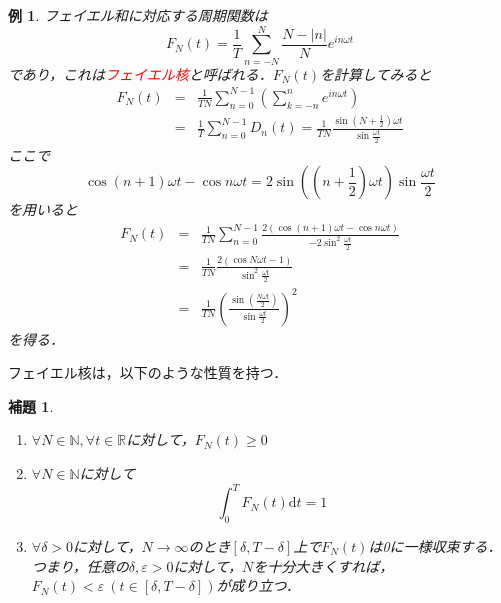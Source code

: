 \documentclass[a4j]{jsbook}
\newtheorem{lemma}[theorem]{補題}
\newtheorem{example}[theorem]{例}
\numberwithin{theorem}{chapter}  %
\begin{document}
\begin{example} 
\label{ex2-8}
フェイエル和に対応する周期関数は
\begin{equation*}
    F_N(t)=\frac{1}{T}\sum_{n=-N}^N\frac{N-|n|}{N}e^{in\omega t}
\end{equation*}
であり，これは\textcolor{red}{フェイエル核}と呼ばれる．\(F_N(t)\)を計算してみると
\begin{eqnarray*}
F_N(t)&=&\frac{1}{TN}\sum_{n=0}^{N-1}\left(\sum_{k=-n}^n e^{in\omega t}\right) \\
&=&\frac{1}{T}\sum_{n=0}^{N-1}D_n(t)=\frac{1}{TN}\frac{\sin\left(N+\frac{1}{2}\right)\omega t}{\sin\frac{\omega t}{2}}
\end{eqnarray*}
ここで
\begin{equation*}
    \cos(n+1)\omega t-\cos n\omega t=2\sin\left(\left(n+\frac{1}{2}\right)\omega t\right)\sin\frac{\omega t}{2}
\end{equation*}
を用いると
\begin{eqnarray*}
F_N(t)&=&\frac{1}{TN}\sum_{n=0}^{N-1}\frac{2(\cos(n+1)\omega t-\cos n\omega t)}{-2\sin^2\frac{\omega t}{2}} \\
&=&\frac{1}{TN}\frac{2(\cos N\omega t-1)}{\sin^2\frac{\omega t}{2}} \\
&=&\frac{1}{TN}\left(\frac{\sin\left(\frac{N\omega t}{2}\right)}{\sin\frac{\omega t}{2}}\right)^2
\end{eqnarray*}
を得る．
\end{example}
フェイエル核は，以下のような性質を持つ．
\begin{lemma}
\label{lem2-13}
\begin{enumerate}
    \renewcommand{\labelenumi}{(\roman{enumi})}
    \item \(\forall N\in\mathbb{N}, \forall t\in\mathbb{R}\)に対して，\(F_N(t)\geq 0\)
    \item \(\forall N\in\mathbb{N}\)に対して
    \begin{equation*}
        \int_0^T F_N(t)\mathrm{d}t=1
    \end{equation*} 
    \item \(\forall\delta>0\)に対して，\(N\to\infty\)のとき\([\delta, T-\delta]\)上で\(F_N(t)\)は0に一様収束する．つまり，任意の\(\delta, \varepsilon>0\)に対して，\(N\)を十分大きくすれば，\(F_N(t)<\varepsilon\ (t\in[\delta, T-\delta])\)が成り立つ．
\end{enumerate}
\end{lemma}
\end{document}
